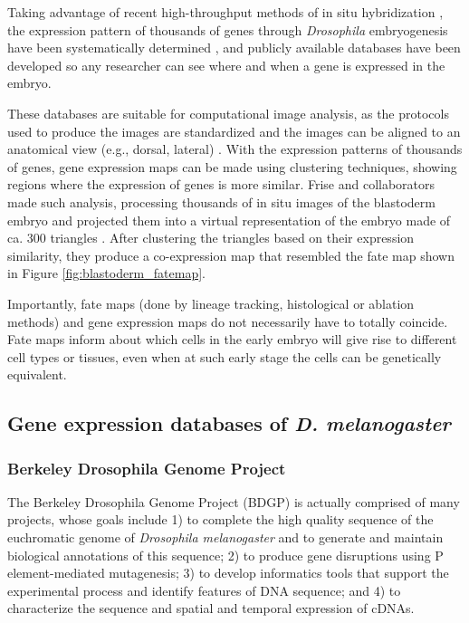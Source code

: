 Taking advantage of recent high-throughput methods of in situ hybridization \citep{Tomancak2002,Weiszmann2009}, the expression pattern of thousands of genes through \textit{Drosophila} embryogenesis have been systematically determined \citep{Tomancak2002,Tomancak2007,Hammonds2013}, and publicly available databases have been developed \citep{Tomancak2002,Kumar2011} so any researcher can see where and when a gene is expressed in the embryo.

These databases are suitable for computational image analysis, as the protocols used to produce the images are standardized \citep{Tomancak2002} and the images can be aligned to an anatomical view (e.g., dorsal, lateral) \citep{Kumar2011}.
With the expression patterns of thousands of genes, gene expression maps can be made using clustering techniques, showing regions where the expression of genes is more similar.
Frise and collaborators made such analysis, processing thousands of in situ images of the blastoderm embryo and projected them into a virtual representation of the embryo made of ca. 300 triangles \citep{Frise2010}. 
After clustering the triangles based on their expression similarity, they produce a co-expression map that resembled the fate map shown in Figure \ref{fig:blastoderm_fatemap}.

Importantly, fate maps (done by lineage tracking, histological or ablation methods) and gene expression maps do not necessarily have to totally coincide. Fate maps inform about which cells in the early embryo will give rise to different cell types or tissues, even when at such early stage the cells can be genetically equivalent.

\subsection{Gene expression databases of \textit{D. melanogaster}}


\subsubsection{Berkeley Drosophila Genome Project}

The Berkeley Drosophila Genome Project (BDGP) is actually comprised of many projects, whose goals include 1) to complete the high quality sequence of the euchromatic genome of \textit{Drosophila melanogaster} and to generate and maintain biological annotations of this sequence; 2) to produce gene disruptions using P element-mediated mutagenesis; 3) to develop informatics tools that support the experimental process and identify features of DNA sequence; and 4) to characterize the sequence and spatial and temporal expression of cDNAs.

